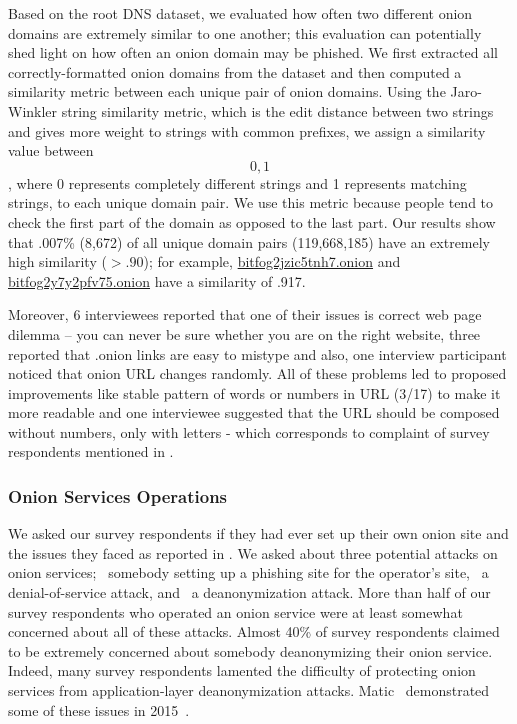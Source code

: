 Based on the root DNS dataset, we evaluated how often two 
different onion domains are extremely similar to one another; this evaluation can potentially shed 
light on how often an onion domain may be phished.  We first extracted all correctly-formatted 
onion domains from the dataset and then computed a similarity metric between each unique pair of onion 
domains.  Using the Jaro-Winkler string similarity metric, which is the edit distance between two strings and gives more weight 
to strings with common prefixes, we assign a similarity value between \[0,1\], where 0 represents completely different strings 
and 1 represents matching strings, to each unique domain pair. We use this metric because people tend to check the first part of the domain as opposed to the last part. 
Our results show that .007\% (8,672) of all unique domain pairs (119,668,185) have an extremely high similarity ($> .90$); for example, 
\url{bitfog2jzic5tnh7.onion} and \url{bitfog2y7y2pfv75.onion} have a similarity of .917.

Moreover, 6 interviewees reported that one of their issues is correct web page dilemma – you can never be sure whether you are on the right website, three reported that .onion links are easy to mistype and also, one interview participant noticed that onion URL changes randomly. All of these problems led to proposed improvements like stable pattern of words or numbers in URL (3/17) to make it more readable and one interviewee suggested that the URL should be composed without numbers, only with letters - which corresponds to complaint of survey respondents mentioned in .

\subsubsection{Onion Services Operations}
We asked our survey respondents if they had ever set up their own onion site and the issues they faced as reported in .  We asked about three potential attacks on onion services; \first~somebody setting up a
phishing site for the operator's site, \second~a denial-of-service attack, and
\third~a deanonymization attack.  More than half of our survey respondents who operated an onion service were at least
somewhat concerned about all of these attacks.  Almost 40\% of survey respondents claimed to be
extremely concerned about somebody deanonymizing their onion service.  Indeed,
many survey respondents lamented the difficulty of protecting onion services from
application-layer deanonymization attacks.  Matic \ea\ demonstrated some of
these issues in 2015~\cite{Matic2015a}.

